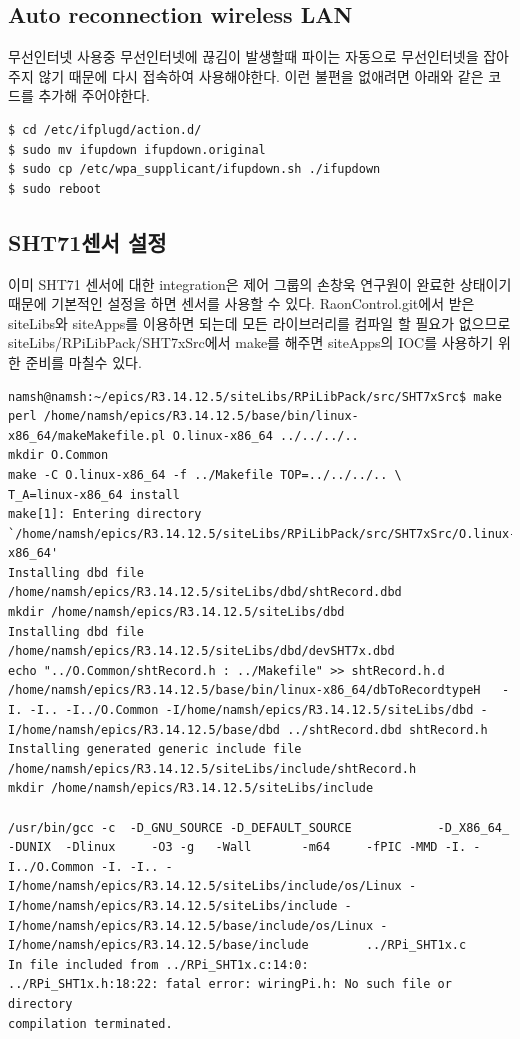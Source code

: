 \documentclass[11pt
  , a4paper
  , article
  , oneside
]{memoir}
\begin{document}
\subsection{Auto reconnection wireless LAN}
무선인터넷 사용중 무선인터넷에 끊김이 발생할때 파이는 자동으로 무선인터넷을 잡아주지 않기 때문에 다시 접속하여 사용해야한다. 이런 불편을 없애려면 아래와 같은 코드를 추가해 주어야한다.
\begin{lstlisting}[style=termstyle]
$ cd /etc/ifplugd/action.d/
$ sudo mv ifupdown ifupdown.original
$ sudo cp /etc/wpa_supplicant/ifupdown.sh ./ifupdown
$ sudo reboot
\end{lstlisting}

\subsection{SHT71센서 설정}
이미 SHT71 센서에 대한 integration은 제어 그룹의 손창욱 연구원이 완료한 상태이기 때문에 기본적인 설정을 하면 센서를 사용할 수 있다.
RaonControl.git에서 받은 siteLibs와 siteApps를 이용하면 되는데 모든 라이브러리를 컴파일 할 필요가 없으므로 siteLibs/RPiLibPack/SHT7xSrc에서 make를 해주면 siteApps의 IOC를 사용하기 위한 준비를 마칠수 있다.
\begin{lstlisting}[style=termstyle]
namsh@namsh:~/epics/R3.14.12.5/siteLibs/RPiLibPack/src/SHT7xSrc$ make
perl /home/namsh/epics/R3.14.12.5/base/bin/linux-x86_64/makeMakefile.pl O.linux-x86_64 ../../../..
mkdir O.Common
make -C O.linux-x86_64 -f ../Makefile TOP=../../../.. \
T_A=linux-x86_64 install
make[1]: Entering directory `/home/namsh/epics/R3.14.12.5/siteLibs/RPiLibPack/src/SHT7xSrc/O.linux-x86_64'
Installing dbd file /home/namsh/epics/R3.14.12.5/siteLibs/dbd/shtRecord.dbd
mkdir /home/namsh/epics/R3.14.12.5/siteLibs/dbd
Installing dbd file /home/namsh/epics/R3.14.12.5/siteLibs/dbd/devSHT7x.dbd
echo "../O.Common/shtRecord.h : ../Makefile" >> shtRecord.h.d
/home/namsh/epics/R3.14.12.5/base/bin/linux-x86_64/dbToRecordtypeH   -I. -I.. -I../O.Common -I/home/namsh/epics/R3.14.12.5/siteLibs/dbd -I/home/namsh/epics/R3.14.12.5/base/dbd ../shtRecord.dbd shtRecord.h
Installing generated generic include file /home/namsh/epics/R3.14.12.5/siteLibs/include/shtRecord.h
mkdir /home/namsh/epics/R3.14.12.5/siteLibs/include

/usr/bin/gcc -c  -D_GNU_SOURCE -D_DEFAULT_SOURCE            -D_X86_64_  -DUNIX  -Dlinux     -O3 -g   -Wall       -m64     -fPIC -MMD -I. -I../O.Common -I. -I.. -I/home/namsh/epics/R3.14.12.5/siteLibs/include/os/Linux -I/home/namsh/epics/R3.14.12.5/siteLibs/include -I/home/namsh/epics/R3.14.12.5/base/include/os/Linux -I/home/namsh/epics/R3.14.12.5/base/include        ../RPi_SHT1x.c 
In file included from ../RPi_SHT1x.c:14:0:
../RPi_SHT1x.h:18:22: fatal error: wiringPi.h: No such file or directory
compilation terminated.
\end{lstlisting}
\end{document}
